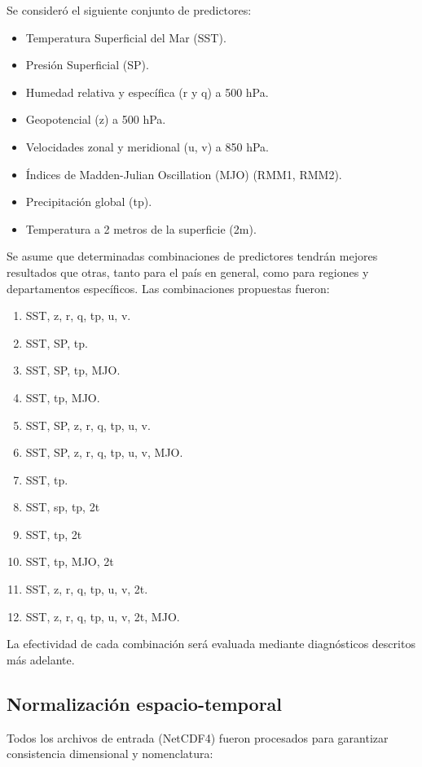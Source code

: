 Se consideró el siguiente conjunto de predictores:
\begin{itemize}
    \item Temperatura Superficial del Mar (SST).
    \item Presión Superficial (SP).
    \item Humedad relativa y específica (r y q) a 500 hPa. 
    \item Geopotencial (z) a 500 hPa. 
    \item Velocidades zonal y meridional (u, v) a 850 hPa. 
    \item Índices de Madden-Julian Oscillation (MJO) (RMM1, RMM2).
    \item Precipitación global (tp).
    \item Temperatura a 2 metros de la superficie (2m).
\end{itemize}

Se asume que determinadas combinaciones de predictores tendrán mejores resultados que otras, tanto para el país en general, como para regiones y departamentos específicos. Las combinaciones propuestas fueron:
\begin{enumerate}
    \item SST, z, r, q, tp, u, v.
    \item SST, SP, tp.
    \item SST, SP, tp, MJO.
    \item SST, tp, MJO. 
    \item SST, SP, z, r, q, tp, u, v.
    \item SST, SP, z, r, q, tp, u, v, MJO.
    \item SST, tp.
    \item SST, sp, tp, 2t
    \item SST, tp, 2t
    \item SST, tp, MJO, 2t
    \item SST, z, r, q, tp, u, v, 2t.
    \item SST, z, r, q, tp, u, v, 2t, MJO.
\end{enumerate}

La efectividad de cada combinación será evaluada mediante diagnósticos descritos más adelante.

\subsection{Normalización espacio-temporal}
Todos los archivos de entrada (NetCDF4) fueron procesados para garantizar consistencia dimensional y nomenclatura:

